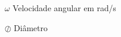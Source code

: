 \begin{simbolos}
  \item[$ \omega $] Velocidade angular em rad/s
  \item[$\oslash $] Diâmetro 
 
\end{simbolos}
